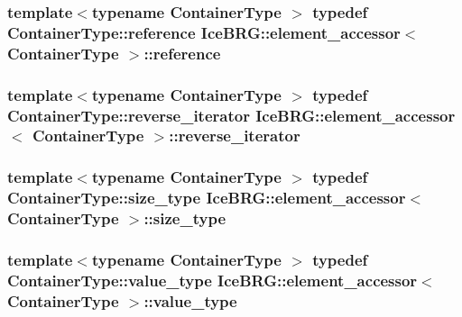 \subsubsection[{reference}]{\setlength{\rightskip}{0pt plus 5cm}template$<$typename Container\+Type $>$ typedef Container\+Type\+::reference {\bf Ice\+B\+R\+G\+::element\+\_\+accessor}$<$ Container\+Type $>$\+::{\bf reference}}\label{classIceBRG_1_1element__accessor_ae31e9fe4b35d76ed6055052fb788de13}
\hypertarget{classIceBRG_1_1element__accessor_a8fc4c41438daa950d66dac2f7613ea18}{}
\subsubsection[{reverse\+\_\+iterator}]{\setlength{\rightskip}{0pt plus 5cm}template$<$typename Container\+Type $>$ typedef Container\+Type\+::reverse\+\_\+iterator {\bf Ice\+B\+R\+G\+::element\+\_\+accessor}$<$ Container\+Type $>$\+::{\bf reverse\+\_\+iterator}}\label{classIceBRG_1_1element__accessor_a8fc4c41438daa950d66dac2f7613ea18}
\hypertarget{classIceBRG_1_1element__accessor_aec3d016f3c5e84e7f9248669a9571208}{}
\subsubsection[{size\+\_\+type}]{\setlength{\rightskip}{0pt plus 5cm}template$<$typename Container\+Type $>$ typedef Container\+Type\+::size\+\_\+type {\bf Ice\+B\+R\+G\+::element\+\_\+accessor}$<$ Container\+Type $>$\+::{\bf size\+\_\+type}}\label{classIceBRG_1_1element__accessor_aec3d016f3c5e84e7f9248669a9571208}
\hypertarget{classIceBRG_1_1element__accessor_ab6c9120cd75bb9ea751fab09967baee9}{}
\subsubsection[{value\+\_\+type}]{\setlength{\rightskip}{0pt plus 5cm}template$<$typename Container\+Type $>$ typedef Container\+Type\+::value\+\_\+type {\bf Ice\+B\+R\+G\+::element\+\_\+accessor}$<$ Container\+Type $>$\+::{\bf value\+\_\+type}}\label{classIceBRG_1_1element__accessor_ab6c9120cd75bb9ea751fab09967baee9}


